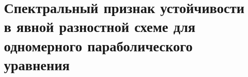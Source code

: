 \documentclass[__main__.tex]{subfiles}
\begin{document}
\section{Спектральный признак устойчивости в явной разностной схеме для одномерного параболического уравнения}
\end{document}
